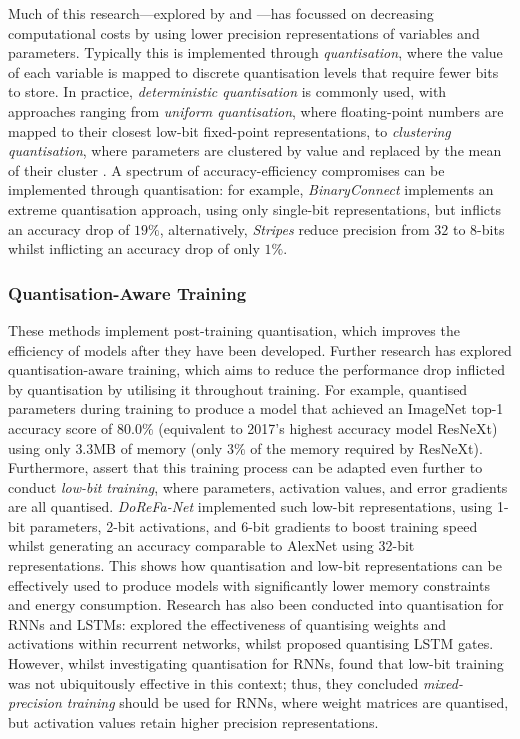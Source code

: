 \documentclass[a4paper, 11pt]{report}
\begin{document}
    Much of this research---explored by \citet{xu-2021} and \citet{cai-2022}---has focussed on decreasing computational costs by using lower precision representations of variables and parameters. Typically this is implemented through \emph{quantisation}, where the value of each variable is mapped to discrete quantisation levels that require fewer bits to store. In practice, \emph{deterministic quantisation} is commonly used, with approaches ranging from \emph{uniform quantisation}, where floating-point numbers are mapped to their closest low-bit fixed-point representations, to \emph{clustering quantisation}, where parameters are clustered by value and replaced by the mean of their cluster \citep{xu-2021}. A spectrum of accuracy-efficiency compromises can be implemented through quantisation: for example, \emph{BinaryConnect} \citep{courbariaux-2015} implements an extreme quantisation approach, using only single-bit representations, but inflicts an accuracy drop of $19\%$, alternatively, \emph{Stripes} \citep{judd-2016} reduce precision from $32$ to $8$-bits whilst inflicting an accuracy drop of only $1\%$.

    \subsubsection{Quantisation-Aware Training}
    \label{section: quantisation-training}

    These methods implement post-training quantisation, which improves the efficiency of models after they have been developed. Further research has explored quantisation-aware training, which aims to reduce the performance drop inflicted by quantisation by utilising it throughout training. For example, \citet{fan-2020b} quantised parameters during training to produce a model that achieved an ImageNet top-1 accuracy score of $80.0\%$ (equivalent to 2017's highest accuracy model ResNeXt) using only $3.3$MB of memory (only $3\%$ of the memory required by ResNeXt). Furthermore, \citet{cai-2022} assert that this training process can be adapted even further to conduct \emph{low-bit training}, where parameters, activation values, and error gradients are all quantised. \emph{DoReFa-Net} \citep{zhou-2016} implemented such low-bit representations, using 1-bit parameters, 2-bit activations, and 6-bit gradients to boost training speed whilst generating an accuracy comparable to AlexNet using 32-bit representations. This shows how quantisation and low-bit representations can be effectively used to produce models with significantly lower memory constraints and energy consumption. Research has also been conducted into quantisation for RNNs and LSTMs: \citet{hubara-2016} explored the effectiveness of quantising weights and activations within recurrent networks, whilst \citet{he-2016} proposed quantising LSTM gates. However, whilst investigating quantisation for RNNs, \citet{ott-2017} found that low-bit training was not ubiquitously effective in this context; thus, they concluded \emph{mixed-precision training} should be used for RNNs, where weight matrices are quantised, but activation values retain higher precision representations.
\end{document}
